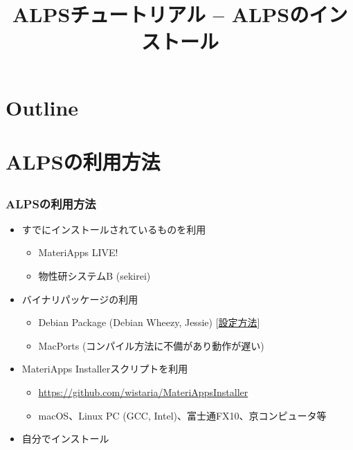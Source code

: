 \title{ALPSチュートリアル -- ALPSのインストール}



\begin{frame}
  \titlepage
\end{frame}

\section*{Outline}
\begin{frame}
  \tableofcontents
\end{frame}

\section{ALPSの利用方法}

\subsection*{\redb\whiteb\greenb}
\begin{frame}[fragile]
  \frametitle{ALPSの利用方法}
  \begin{itemize}
    \setlength{\itemsep}{1em}
  \item すでにインストールされているものを利用
    \begin{itemize}
    \item MateriApps LIVE!
    \item 物性研システムB (sekirei)
    \end{itemize}
  \item バイナリパッケージの利用
    \begin{itemize}
    \item Debian Package (Debian Wheezy, Jessie) [\href{https://github.com/cmsi/MateriAppsLive/wiki/UsingMateriAppsInDebian}{設定方法}]
    \item MacPorts (コンパイル方法に不備があり動作が遅い)
    \end{itemize}
  \item MateriApps Installerスクリプトを利用
    \begin{itemize}
    \item \url{https://github.com/wistaria/MateriAppsInstaller}
    \item macOS、Linux PC (GCC, Intel)、富士通FX10、京コンピュータ等
    \end{itemize}
  \item 自分でインストール
  \end{itemize}
\end{frame}


